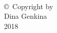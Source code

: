 
\thispagestyle{empty}
\hbox{\ }

\vfill
\renewcommand{\baselinestretch}{1}
\small\normalsize

\vspace{-.65in}

\begin{center}
\large{\copyright \hbox{ }Copyright by\\
Dina Genkina  %
\\
2018}
\end{center}

\vfill

\newpage

\hbox{\ }
\newpage
